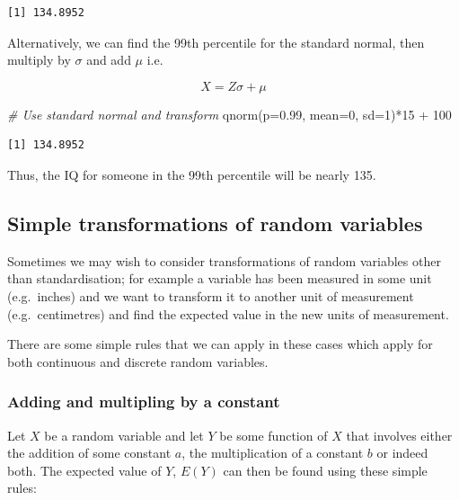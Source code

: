 \documentclass[
  oneside]{krantz}
\newenvironment{Shaded}{\begin{snugshade}}{\end{snugshade}}
\newcommand{\AttributeTok}[1]{\textcolor[rgb]{0.77,0.63,0.00}{#1}}
\newcommand{\CommentTok}[1]{\textcolor[rgb]{0.56,0.35,0.01}{\textit{#1}}}
\newcommand{\DecValTok}[1]{\textcolor[rgb]{0.00,0.00,0.81}{#1}}
\newcommand{\FloatTok}[1]{\textcolor[rgb]{0.00,0.00,0.81}{#1}}
\newcommand{\FunctionTok}[1]{\textcolor[rgb]{0.00,0.00,0.00}{#1}}
\newcommand{\NormalTok}[1]{#1}
\newcommand{\SpecialCharTok}[1]{\textcolor[rgb]{0.00,0.00,0.00}{#1}}
\begin{document}
\begin{verbatim}
[1] 134.8952
\end{verbatim}

Alternatively, we can find the 99th percentile for the standard normal, then multiply by \(\sigma\) and add \(\mu\) i.e.~

\[ X = Z \sigma + \mu\]

\begin{Shaded}
\begin{Highlighting}[]
\CommentTok{\# Use standard normal and transform}
\FunctionTok{qnorm}\NormalTok{(}\AttributeTok{p=}\FloatTok{0.99}\NormalTok{, }\AttributeTok{mean=}\DecValTok{0}\NormalTok{, }\AttributeTok{sd=}\DecValTok{1}\NormalTok{)}\SpecialCharTok{*}\DecValTok{15} \SpecialCharTok{+} \DecValTok{100}
\end{Highlighting}
\end{Shaded}

\begin{verbatim}
[1] 134.8952
\end{verbatim}

Thus, the IQ for someone in the 99th percentile will be nearly 135.

\hypertarget{simple-transformations-of-random-variables}{%
\subsection{Simple transformations of random variables}\label{simple-transformations-of-random-variables}}

Sometimes we may wish to consider transformations of random variables other than standardisation; for example a variable has been measured in some unit (e.g.~inches) and we want to transform it to another unit of measurement (e.g.~centimetres) and find the expected value in the new units of measurement.

There are some simple rules that we can apply in these cases which apply for both continuous and discrete random variables.

\hypertarget{adding-and-multipling-by-a-constant}{%
\subsubsection{Adding and multipling by a constant}\label{adding-and-multipling-by-a-constant}}

Let \(X\) be a random variable and let \(Y\) be some function of \(X\) that involves either the addition of some constant \(a\), the multiplication of a constant \(b\) or indeed both. The expected value of \(Y\), \(E(Y)\) can then be found using these simple rules:
\end{document}
